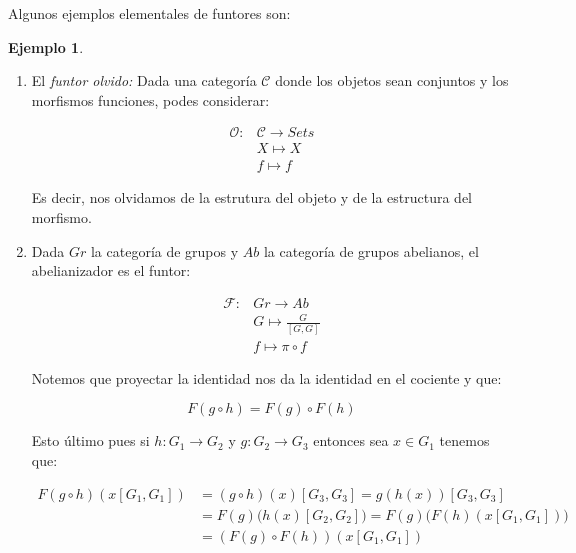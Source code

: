 \documentclass{article}
\theoremstyle{plain}
\theoremstyle{definition}
\newtheorem{ejemplo}[theorem]{Ejemplo}
\theoremstyle{remark}
\begin{document}
Algunos ejemplos elementales de funtores son:

\begin{ejemplo}
    \begin{enumerate}
        \item El \textit{funtor olvido:} Dada una categoría $\mathcal{C}$ donde los objetos sean conjuntos y los morfismos funciones, podes considerar:

        \begin{align*}
              \mathcal{O}: & \mathcal{C} \longrightarrow Sets \\
              & X \longmapsto X \\
              & f \longmapsto f
        \end{align*}

        Es decir, nos olvidamos de la estrutura del objeto y de la estructura del morfismo. 

        \item Dada $Gr$ la categoría de grupos y $Ab$ la categoría de grupos abelianos, el abelianizador es el funtor:

        \begin{align*}
              \mathcal{F}: & Gr \longrightarrow Ab \\
              & G \longmapsto \frac{G}{[G,G]} \\
              & f \longmapsto \pi \circ f
        \end{align*}

        Notemos que proyectar la identidad nos da la identidad en el cociente y que:

        \begin{equation*}
            F(g \circ h) = F(g) \circ F(h)
        \end{equation*}

        Esto último pues si $h:G_1\to G_2$ y $g:G_2 \to G_3$ entonces sea $x \in G_1$ tenemos que:

        \begin{align*}
            F(g \circ h)(x[G_1,G_1]) &= (g \circ h)(x) [G_3, G_3] = g(h(x)) [G_3, G_3] \\
            &= F(g)\big(h(x) [G_2, G_2]\big) = F(g)\big(F(h)(x[G_1,G_1])\big) \\
            &= (F(g) \circ F(h))(x[G_1,G_1])
        \end{align*}


    \end{enumerate}
\end{ejemplo}
\end{document}

